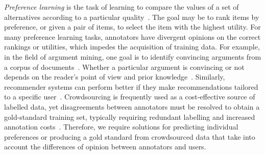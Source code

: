 %
\emph{Preference learning} is the task of learning to compare the values of a set of alternatives
according to a particular quality~\citep{furnkranz2010preference}. The goal may be to 
rank items by preference, or given a pair of items, to select the item with the highest utility.
For many preference learning tasks, annotators have divergent opinions on the correct rankings or utilities,
which impedes the acquisition of training data.
For example, in the field of argument mining, one goal is to 
identify convincing arguments from a corpus of documents~\citep{habernal2016argument}. 
Whether a particular argument is convincing or not depends on the reader's point of view and prior knowledge~\citep{lukin2017argument}.
Similarly, recommender systems can perform better if they make recommendations tailored
to a specific user~\citep{resnick1997recommender}.
Crowdsourcing is frequently used as a cost-effective source of labelled data, 
yet disagreements between annotators must be resolved to obtain a gold-standard
training set, typically requiring redundant labelling and increased annotation costs~\citep{snow2008cheap,banerji2010galaxy,gaunt2016training}.
Therefore, we require solutions for predicting individual preferences or 
producing a gold standard from crowdsourced data
that take into account the differences of opinion between annotators and users.

